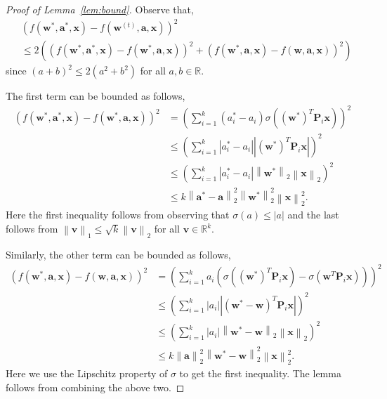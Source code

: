 \documentclass[11pt]{article}
\newcommand{\mat}[1]{\mathbf{#1}}
\newcommand{\vect}[1]{\mathbf{#1}}
\newcommand{\norm}[1]{\left\|#1\right\|}
\begin{document}
\begin{proof}[Proof of Lemma~\ref{lem:bound}]
Observe that,
\begin{align*}
&\left(f\left(\vect{w}^*, \vect{a}^*, \vect{x}\right) - f\left(\vect{w}^{\left(t\right)}, \vect{a}, \vect{x}\right)\right)^2 \\
& \leq 2\left(\left(f\left(\vect{w}^*, \vect{a}^*, \vect{x}\right) - f\left(\vect{w}^*, \vect{a}, \vect{x}\right)\right)^2 + \left(f\left(\vect{w}^*, \vect{a}, \vect{x}\right) -f\left(\vect{w}, \vect{a}, \vect{x}\right)\right)^2\right)
\end{align*}
since $\left(a + b\right)^2 \leq 2\left(a^2  + b^2\right)$ for all $a, b \in \mathbb{R}$.

The first term can be bounded as follows,
\begin{align*}
\left(f\left(\vect{w}^*, \vect{a}^*, \vect{x}\right) - f\left(\vect{w}^*, \vect{a}, \vect{x}\right)\right)^2 &= \left(\sum_{i=1}^k \left(a^*_i - a_i\right) \sigma \left(\left(\vect{w}^*\right)^T \mat{P}_i \vect{x}\right)\right)^2\\
& \leq \left(\sum_{i=1}^k |a^*_i - a_i| |\left(\vect{w}^*\right)^T \mat{P}_i \vect{x}|\right)^2\\
& \leq \left(\sum_{i=1}^k |a^*_i - a_i| \norm{\vect{w}^*}_2 \norm{\vect{x}}_2\right)^2\\
& \leq k \norm{\vect{a}^* - \vect{a}}_2^2\norm{\vect{w}^*}_2^2 \norm{\vect{x}}_2^2.
\end{align*}
Here the first inequality follows from observing that $\sigma\left(a\right) \leq |a|$ and the last follows from $\norm{\vect{v}}_1 \leq \sqrt{k} \norm{\vect{v}}_2$ for all $\vect{v} \in \mathbb{R}^k$.

Similarly, the other term can be bounded as follows,
\begin{align*}
\left(f\left(\vect{w}^*, \vect{a}, \vect{x}\right) - f\left(\vect{w}, \vect{a}, \vect{x}\right)\right)^2 &= \left(\sum_{i=1}^k a_i \left(\sigma \left(\left(\vect{w}^*\right)^T \mat{P}_i \vect{x}\right) - \sigma \left(\vect{w}^T \mat{P}_i \vect{x}\right)\right)\right)^2\\
& \leq \left(\sum_{i=1}^k |a_i| |\left(\vect{w}^* - \vect{w}\right)^T \mat{P}_i \vect{x}|\right)^2\\
& \leq \left(\sum_{i=1}^k |a_i| \norm{\vect{w}^* - \vect{w}}_2 \norm{\vect{x}}_2\right)^2\\
& \leq k \norm{\vect{a}}_2^2\norm{\vect{w}^* - \vect{w}}_2^2 \norm{\vect{x}}_2^2.
\end{align*}
Here we use the Lipschitz property of $\sigma$ to get the first inequality. The lemma follows from combining the above two.
\end{proof}
\end{document}
